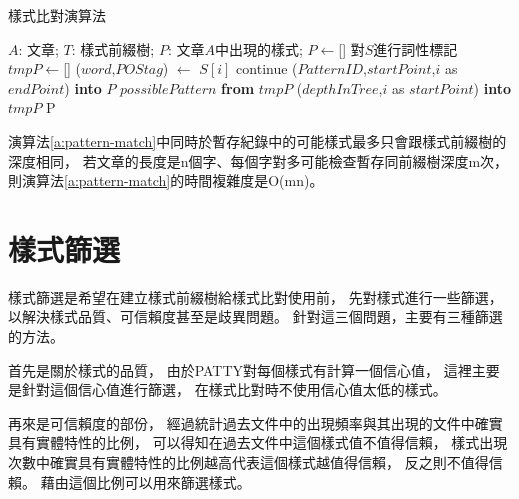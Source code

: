 \begin{algorithm}
    \caption{樣式比對演算法}
    \label{a:pattern-match}
    \begin{algorithmic}[1]
        \Require  
            $A$: 文章;
            $T$: 樣式前綴樹;
        \Ensure
            $P$: 文章$A$中出現的樣式;
        \State $P\gets$[]
            \State 對$S$進行詞性標記
            \State $tmpP\gets$[]
                \State ($word$,$POStag$) $\gets$ $S[i]$
                        \State continue
                    \Else
                             ($PatternID$,$startPoint$,$i$ as $endPoint$) {\bf into} $P$
                        \EndIf
                         $possiblePattern$ {\bf from} $tmpP$
                    \EndIf
                \EndFor
                 ($depthInTree$,$i$ as $startPoint$) {\bf into} $tmpP$
                \EndIf
            \EndFor
        \EndFor
        \State \Return P
    \end{algorithmic}
\end{algorithm}

演算法\ref{a:pattern-match}中同時於暫存紀錄中的可能樣式最多只會跟樣式前綴樹的深度相同，
若文章的長度是n個字、每個字對多可能檢查暫存同前綴樹深度m次，
則演算法\ref{a:pattern-match}的時間複雜度是O(mn)。

\section{樣式篩選}
\label{s:select-pattern}
樣式篩選是希望在建立樣式前綴樹給樣式比對使用前，
先對樣式進行一些篩選，以解決樣式品質、可信賴度甚至是歧異問題。
針對這三個問題，主要有三種篩選的方法。

首先是關於樣式的品質，
由於PATTY對每個樣式有計算一個信心值，
這裡主要是針對這個信心值進行篩選，
在樣式比對時不使用信心值太低的樣式。

再來是可信賴度的部份，
經過統計過去文件中的出現頻率與其出現的文件中確實具有實體特性的比例，
可以得知在過去文件中這個樣式值不值得信賴，
樣式出現次數中確實具有實體特性的比例越高代表這個樣式越值得信賴，
反之則不值得信賴。
藉由這個比例可以用來篩選樣式。

